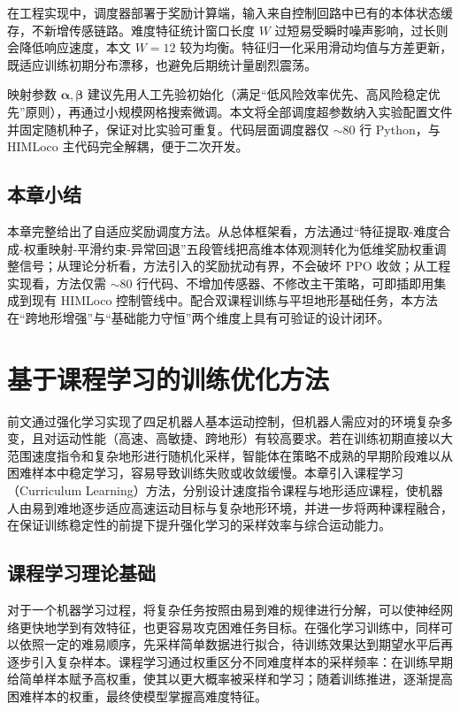 \documentclass[12pt,a4paper]{ctexart}
\numberwithin{equation}{section}
\numberwithin{table}{section}
\numberwithin{figure}{section}
\newcommand{\subtopic}[1]{\par\addvspace{0.2\baselineskip}\ignorespaces}
\begin{document}
\subtopic{工程实现注意事项}
在工程实现中，调度器部署于奖励计算端，输入来自控制回路中已有的本体状态缓存，不新增传感链路。难度特征统计窗口长度 $W$ 过短易受瞬时噪声影响，过长则会降低响应速度，本文 $W=12$ 较为均衡。特征归一化采用滑动均值与方差更新，既适应训练初期分布漂移，也避免后期统计量剧烈震荡。

映射参数 $\bm{\alpha},\bm{\beta}$ 建议先用人工先验初始化（满足“低风险效率优先、高风险稳定优先”原则），再通过小规模网格搜索微调。本文将全部调度超参数纳入实验配置文件并固定随机种子，保证对比实验可重复。代码层面调度器仅 $\sim 80$ 行 Python，与 HIMLoco 主代码完全解耦，便于二次开发。

\subsection{本章小结}
本章完整给出了自适应奖励调度方法。从总体框架看，方法通过“特征提取-难度合成-权重映射-平滑约束-异常回退”五段管线把高维本体观测转化为低维奖励权重调整信号；从理论分析看，方法引入的奖励扰动有界，不会破坏 PPO 收敛；从工程实现看，方法仅需 $\sim 80$ 行代码、不增加传感器、不修改主干策略，可即插即用集成到现有 HIMLoco 控制管线中。配合双课程训练与平坦地形基础任务，本方法在“跨地形增强”与“基础能力守恒”两个维度上具有可验证的设计闭环。


\clearpage
\section{基于课程学习的训练优化方法}
前文通过强化学习实现了四足机器人基本运动控制，但机器人需应对的环境复杂多变，且对运动性能（高速、高敏捷、跨地形）有较高要求。若在训练初期直接以大范围速度指令和复杂地形进行随机化采样，智能体在策略不成熟的早期阶段难以从困难样本中稳定学习，容易导致训练失败或收敛缓慢。本章引入课程学习（Curriculum Learning）方法，分别设计速度指令课程与地形适应课程，使机器人由易到难地逐步适应高速运动目标与复杂地形环境，并进一步将两种课程融合，在保证训练稳定性的前提下提升强化学习的采样效率与综合运动能力。

\subsection{课程学习理论基础}
对于一个机器学习过程，将复杂任务按照由易到难的规律进行分解，可以使神经网络更快地学到有效特征，也更容易攻克困难任务目标。在强化学习训练中，同样可以依照一定的难易顺序，先采样简单数据进行拟合，待训练效果达到期望水平后再逐步引入复杂样本。课程学习通过权重区分不同难度样本的采样频率：在训练早期给简单样本赋予高权重，使其以更大概率被采样和学习；随着训练推进，逐渐提高困难样本的权重，最终使模型掌握高难度特征。
\end{document}
